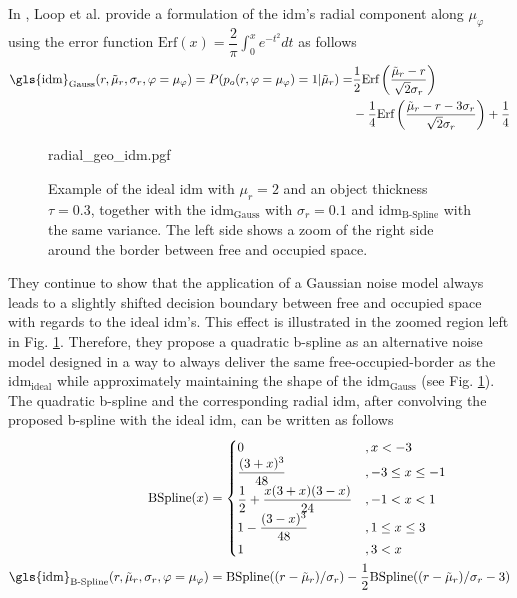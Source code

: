 In \cite{loop2016closed}, Loop et al. provide a formulation of the \gls{idm}'s radial component along $\mu_\varphi$ using the error function $\text{Erf}(x) = \dfrac{2}{\pi} \int_{0}^{x}e^{-t^2}dt$ as follows 
\begin{align}
	\label{eq:gauss_idm}
	\text{\gls{idm}}_{\text{Gauss}}(r,\tilde{\mu}_r, \sigma_r, \varphi = \mu_\varphi) = P(p_o(r, \varphi = \mu_\varphi) = 1 |\tilde{\mu}_r)  =& \dfrac{1}{2}\text{Erf}\left(\dfrac{\tilde{\mu}_r-r}{\sqrt{2}\sigma_r}\right)\\
	&- \dfrac{1}{4}\text{Erf}\left(\dfrac{\tilde{\mu}_r - r - 3\sigma_r}{\sqrt{2}\sigma_r}\right) + \dfrac{1}{4} \notag
\end{align}
\begin{figure}
	\begin{center}
		{radial_geo_idm.pgf}
		\caption{\label{fig:radial_geo_idm}Example of the ideal \gls{idm} with $\mu_r = 2$ and an object thickness $\tau = 0.3$, together with the \gls{idm}$_{\text{Gauss}}$ with $\sigma_r = 0.1$ and \gls{idm}$_{\text{B-Spline}}$ with the same variance. The left side shows a zoom of the right side around the border between free and occupied space.}
	\end{center}
\end{figure} 
They continue to show that the application of a Gaussian noise model always leads to a slightly shifted decision boundary between free and occupied space with regards to the ideal \gls{idm}'s. This effect is illustrated in the zoomed region left in Fig. \ref{fig:radial_geo_idm}. Therefore, they propose a quadratic b-spline as an alternative noise model designed in a way to always deliver the same free-occupied-border as the \gls{idm}$_{\text{ideal}}$ while approximately maintaining the shape of the \gls{idm}$_{\text{Gauss}}$ (see Fig. \ref{fig:radial_geo_idm}). The quadratic b-spline and the corresponding radial \gls{idm}, after convolving the proposed b-spline with the ideal \gls{idm}, can be written as follows
\begin{align}
	\label{eq:bspline}
	\text{BSpline}(x) &= 
	\begin{cases}
		0 &, x < -3\\
		\dfrac{(3+x)^3}{48} &, -3 \leq x \leq -1\\
		\dfrac{1}{2}+\dfrac{x(3+x)(3-x)}{24} &, -1 < x < 1\\
		1-\dfrac{(3-x)^3}{48} &, 1 \leq x \leq 3\\
		1 &, 3 < x\\
	\end{cases}\\
%
	\label{eq:bspline_idm}
	\text{\gls{idm}}_{\text{B-Spline}}(r,\tilde{\mu}_r, \sigma_r, \varphi = \mu_\varphi) &= \text{BSpline}((r - \tilde{\mu}_r)/\sigma_r) - \dfrac{1}{2}\text{BSpline}((r - \tilde{\mu}_r)/\sigma_r - 3)
\end{align}
